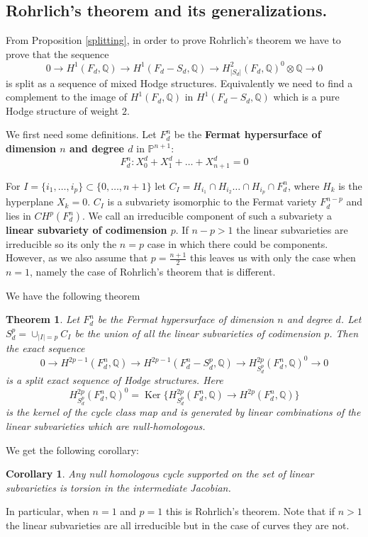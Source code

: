 \documentclass[12pt,reqno]{article}
\newtheorem{thm}[defn]{Theorem}
\newtheorem{cor}[defn]{Corollary}
\newcommand {\Q}{{\mathds Q}}
\newcommand {\CP}{{\mathds P}}
\def\Ker{\operatorname{Ker}}
\begin{document}
		\subsection{Rohrlich's theorem and its generalizations.}
		
	From Proposition \ref{splitting}, 	in order to prove  Rohrlich's theorem we have to prove that the sequence 
	$$0 \rightarrow H^1(F_d,\Q) \rightarrow H^1(F_d-S_d,\Q) \rightarrow H^{2}_{|S_d|}(F_d,\Q)^0 \otimes \Q \rightarrow 0$$ 
	is split as a sequence of mixed Hodge structures. Equivalently we need to find a complement to the image of $H^1(F_d,\Q)$ in $H^1(F_d-S_d,\Q)$ which is a pure Hodge structure of weight $2$. 
	

	We first need some definitions. Let $F^n_d$ be the {\bf Fermat hypersurface of dimension $n$ and degree $d$} in $\CP^{n+1}$:
		$$F^n_d:X_0^d+X_1^d+\dots+X_{n+1}^d=0$$
		 
  For $I=\{i_1,\dots,i_p \} \subset \{0,\dots,n+1\}$ let $C_I=H_{i_1} \cap H_{i_2} \dots \cap H_{i_p} \cap F^n_d$, where $H_k$ is the hyperplane $X_k=0$. $C_I$ is a subvariety isomorphic to the Fermat variety $F_d^{n-p}$ and lies in $CH^p(F_d^n)$. We call an irreducible component of  such a subvariety a {\bf linear subvariety of codimension $p$}. If $n-p>1$ the linear subvarieties are irreducible so its only the $n=p$ case in which there could be components. However, as we also assume that $p=\frac{n+1}{2}$ this leaves us with only the case when $n=1$, namely the case of Rohrlich's theorem that is different. 
  
  We have the following theorem 
  
  \begin{thm} Let $F^n_d$ be the Fermat hypersurface of dimension $n$ and degree $d$. Let $S_d^p=\cup_{|I|=p} C_I$ be the union of all the linear subvarieties of codimension $p$.  Then the exact sequence 
	$$0 \rightarrow H^{2p-1}(F^n_d,\Q) \rightarrow H^{2p-1}(F^n_d-S_d^p,\Q) \rightarrow H^{2p}_{S_d^p}(F_d^n,\Q)^0 \rightarrow 0$$
	is a split exact sequence of Hodge structures. Here 
	$$H^{2p}_{S_d^p}(F_d^n,\Q)^0=\Ker\{H^{2p}_{S_d^p}(F^n_d,\Q) \rightarrow H^{2p}(F^n_d,\Q)\}$$
	is the kernel of the cycle class map and is generated by linear combinations of the linear subvarieties  which are null-homologous.
	\label{nullhomologoustheorem} 
	\end{thm}
	
	We get the following corollary: 
%	
 \begin{cor}
 	\label{nullhomologouscorollary}
	Any null homologous cycle supported on the set of linear subvarieties  is torsion in the intermediate Jacobian. 
\end{cor}
%
In particular, when $n=1$ and $p=1$ this is Rohrlich's theorem. Note that if $n>1$ the linear subvarieties are all irreducible but in the case of curves they are not. 
			
\end{document}
